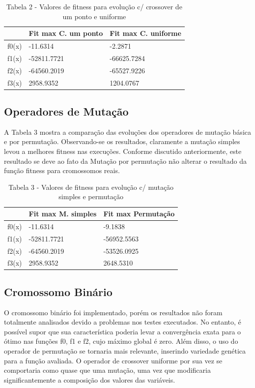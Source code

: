\documentclass[conference]{IEEEtran}
\begin{document}
\begin{table}[]
\begin{tabular}{|l|l|l|}
\hline
      & Fit max C. um ponto & Fit max C. uniforme \\ \hline
f0(x) & -11.6314            & -2.2871             \\ \hline
f1(x) & -52811.7721         & -66625.7284         \\ \hline
f2(x) & -64560.2019         & -65527.9226         \\ \hline
f3(x) & 2958.9352           & 1204.0767           \\ \hline
\end{tabular}
\caption*{Tabela 2 - Valores de fitness para evolução c/ crossover de um ponto e uniforme}
\end{table}

\subsection{Operadores de Mutação}
A Tabela 3 mostra a comparação das evoluções dos operadores de mutação básica e
por permutação. Observando-se os resultados, claramente a mutação simples levou 
a melhores fitness nas execuções. Conforme discutido anteriormente, este 
resultado se deve ao fato da Mutação por permutação não alterar o resultado da 
função fitness para cromossomos reais.\\

\begin{table}[]
\begin{tabular}{|l|l|l|}
\hline
      & Fit max M. simples  & Fit max Permutação  \\ \hline
f0(x) & -11.6314            & -9.1838             \\ \hline
f1(x) & -52811.7721         & -56952.5563         \\ \hline
f2(x) & -64560.2019         & -53526.0925         \\ \hline
f3(x) & 2958.9352           & 2648.5310           \\ \hline
\end{tabular}
\caption*{Tabela 3 - Valores de fitness para evolução c/ mutação simples e permutação}
\end{table}


\subsection{Cromossomo Binário}
O cromossomo binário foi implementado, porém os resultados não foram totalmente 
analisados devido a problemas nos testes executados. 
No entanto, é possível supor que sua característica poderia levar a convergência
exata para o ótimo nas funções f0, f1 e f2, cujo máximo global é zero.
Além disso, o uso do operador de permutação se tornaria mais relevante,
inserindo variedade genética para a função avaliada.
O operador de crossover uniforme por sua vez se comportaria como quase que uma 
mutação, uma vez que modificaria significantemente a composição dos valores das 
variáveis.
\end{document}
